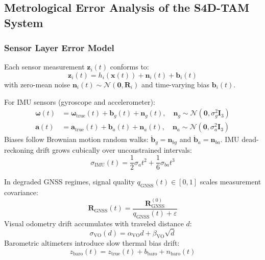 \subsection{Metrological Error Analysis of the S4D-TAM System}
\label{subsec:metrological_analysis}

\subsubsection{Sensor Layer Error Model}
Each sensor measurement $\mathbf{z}_i(t)$ conforms to:
\begin{equation}
  \mathbf{z}_i(t) = h_i(\mathbf{x}(t)) + \mathbf{n}_i(t) + \mathbf{b}_i(t)
\end{equation}
with zero-mean noise $\mathbf{n}_i(t) \sim \mathcal{N}(\mathbf{0}, \mathbf{R}_i)$ and time-varying bias $\mathbf{b}_i(t)$.

For IMU sensors (gyroscope and accelerometer):
\begin{align}
  \boldsymbol{\omega}(t) &= \boldsymbol{\omega}_{\text{true}}(t) + \mathbf{b}_g(t) + \mathbf{n}_g(t), \quad \mathbf{n}_g \sim \mathcal{N}(\mathbf{0}, \sigma_g^2 \mathbf{I}_3) \\
  \mathbf{a}(t) &= \mathbf{a}_{\text{true}}(t) + \mathbf{b}_a(t) + \mathbf{n}_a(t), \quad \mathbf{n}_a \sim \mathcal{N}(\mathbf{0}, \sigma_a^2 \mathbf{I}_3)
\end{align}
Biases follow Brownian motion random walks: $\dot{\mathbf{b}}_g = \mathbf{n}_{bg}$ and $\dot{\mathbf{b}}_a = \mathbf{n}_{ba}$. IMU dead-reckoning drift grows cubically over unconstrained intervals:
\begin{equation}
  \sigma_{\text{IMU}}(t) = \frac{1}{2}\sigma_a t^2 + \frac{1}{6}\sigma_{ba} t^3
\end{equation}

In degraded GNSS regimes, signal quality $q_{\text{GNSS}}(t) \in [0, 1]$ scales measurement covariance:
\begin{equation}
  \mathbf{R}_{\text{GNSS}}(t) = \frac{\mathbf{R}_{\text{GNSS}}^{(0)}}{q_{\text{GNSS}}(t) + \varepsilon}
\end{equation}
Visual odometry drift accumulates with traveled distance $d$:
\begin{equation}
  \sigma_{\text{VO}}(d) = \alpha_{\text{VO}} d + \beta_{\text{VO}} \sqrt{d}
\end{equation}
Barometric altimeters introduce slow thermal bias drift:
\begin{equation}
  z_{\text{baro}}(t) = z_{\text{true}}(t) + b_{\text{baro}} + n_{\text{baro}}(t)
\end{equation}

